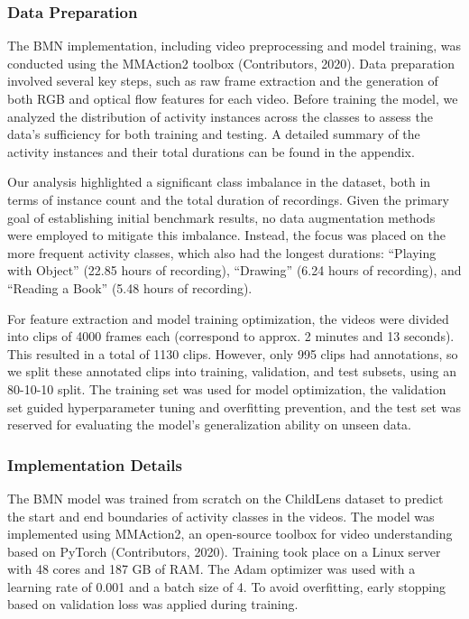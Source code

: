 \documentclass[
  man,floatsintext]{apa6}
\begin{document}
\subsubsection{Data Preparation}\label{data-preparation}

The BMN implementation, including video preprocessing and model training, was conducted using the MMAction2 toolbox (Contributors, 2020). Data preparation involved several key steps, such as raw frame extraction and the generation of both RGB and optical flow features for each video. Before training the model, we analyzed the distribution of activity instances across the classes to assess the data's sufficiency for both training and testing. A detailed summary of the activity instances and their total durations can be found in the appendix.

Our analysis highlighted a significant class imbalance in the dataset, both in terms of instance count and the total duration of recordings. Given the primary goal of establishing initial benchmark results, no data augmentation methods were employed to mitigate this imbalance. Instead, the focus was placed on the more frequent activity classes, which also had the longest durations: ``Playing with Object'' (22.85 hours of recording), ``Drawing'' (6.24 hours of recording), and ``Reading a Book'' (5.48 hours of recording).

For feature extraction and model training optimization, the videos were divided into clips of 4000 frames each (correspond to approx. 2 minutes and 13 seconds). This resulted in a total of 1130 clips. However, only 995 clips had annotations, so we split these annotated clips into training, validation, and test subsets, using an 80-10-10 split. The training set was used for model optimization, the validation set guided hyperparameter tuning and overfitting prevention, and the test set was reserved for evaluating the model's generalization ability on unseen data.

\subsubsection{Implementation Details}\label{implementation-details}

The BMN model was trained from scratch on the ChildLens dataset to predict the start and end boundaries of activity classes in the videos. The model was implemented using MMAction2, an open-source toolbox for video understanding based on PyTorch (Contributors, 2020). Training took place on a Linux server with 48 cores and 187 GB of RAM. The Adam optimizer was used with a learning rate of 0.001 and a batch size of 4. To avoid overfitting, early stopping based on validation loss was applied during training.
\end{document}
